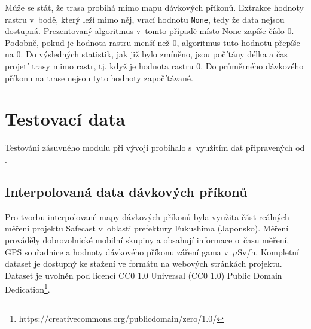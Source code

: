 		\begin{algorithm}
		\begin{algorithmic} [1] 

			    \ELSE
{}
			\ENDIF
			
			\ENDIF {} 
		\ENDFOR
		
		  
	\end{algorithmic}
\end{algorithm}

Může se stát, že trasa probíhá mimo mapu dávkových příkonů. Extrakce
hodnoty rastru v~bodě, který leží mimo něj, vrací hodnotu
\texttt{None}, tedy že data nejsou dostupná. Prezentovaný algoritmus
v~tomto případě místo None zapíše číslo 0. Podobně, pokud je hodnota
rastru menší než 0, algoritmus tuto hodnotu přepíše na 0. Do
výsledných statistik, jak již bylo zmíněno, jsou počítány délka a čas
projetí trasy mimo rastr, tj. když je hodnota rastru 0. Do průměrného
dávkového příkonu na trase nejsou tyto hodnoty započítávané.


\section{Testovací data} Testování zásuvného modulu při vývoji
probíhalo s~využitím dat připravených od .

\subsection{Interpolovaná data dávkových příkonů} Pro tvorbu
interpolované mapy dávkových příkonů byla využita část reálných měření
projektu Safecast v~oblasti prefektury Fukushima (Japonsko). Měření
prováděly dobrovolnické mobilní skupiny a obsahují informace o~času
měření, GPS souřadnice a hodnoty dávkového příkonu záření gama
v~$\mu$Sv/h. Kompletní dataset je dostupný ke stažení ve formátu
 na webových stránkách projektu. Dataset je uvolněn pod
licencí CC0 1.0 Universal (CC0 1.0) Public Domain
Dedication\footnote{https://creativecommons.org/publicdomain/zero/1.0/}.

